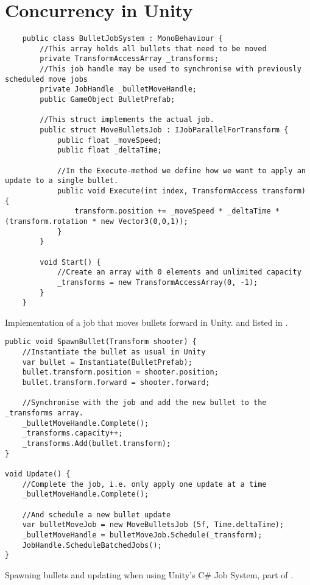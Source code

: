 \chapter{Concurrency in Unity}\label{app:unity:conc}
\begin{listing}[H]
    \begin{verbatim}
    public class BulletJobSystem : MonoBehaviour {
        //This array holds all bullets that need to be moved
        private TransformAccessArray _transforms;
        //This job handle may be used to synchronise with previously scheduled move jobs
        private JobHandle _bulletMoveHandle;
        public GameObject BulletPrefab;
    
        //This struct implements the actual job.
        public struct MoveBulletsJob : IJobParallelForTransform {
            public float _moveSpeed;
            public float _deltaTime;
    
            //In the Execute-method we define how we want to apply an update to a single bullet.
            public void Execute(int index, TransformAccess transform) {
                transform.position += _moveSpeed * _deltaTime * (transform.rotation * new Vector3(0,0,1));
            }
        }
    
        void Start() {
            //Create an array with 0 elements and unlimited capacity
            _transforms = new TransformAccessArray(0, -1);
        }
    }
    \end{verbatim}
    \caption{Implementation of a job that moves bullets forward in Unity.  and  listed in .} \label{lst:unity:job:example}
    \end{listing}

\begin{listing}
    \begin{verbatim}
public void SpawnBullet(Transform shooter) {
    //Instantiate the bullet as usual in Unity
    var bullet = Instantiate(BulletPrefab);
    bullet.transform.position = shooter.position;
    bullet.transform.forward = shooter.forward;

    //Synchronise with the job and add the new bullet to the _transforms array.
    _bulletMoveHandle.Complete();
    _transforms.capacity++;
    _transforms.Add(bullet.transform);
}

void Update() {
    //Complete the job, i.e. only apply one update at a time
    _bulletMoveHandle.Complete();

    //And schedule a new bullet update
    var bulletMoveJob = new MoveBulletsJob (5f, Time.deltaTime);
    _bulletMoveHandle = bulletMoveJob.Schedule(_transform);
    JobHandle.ScheduleBatchedJobs();
}
    \end{verbatim}
    \caption{Spawning bullets and updating when using Unity's C\# Job System, part of .}
    \label{lst:unity:job:example:2}
\end{listing}

